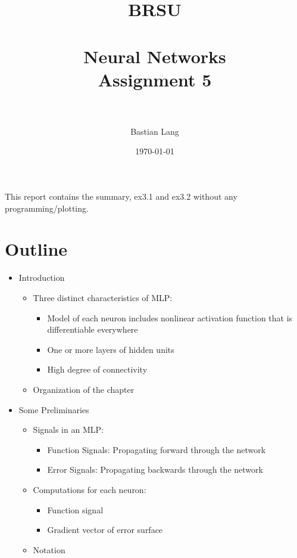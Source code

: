 \documentclass[paper=a4, fontsize=11pt]{scrartcl} %
\title{	
\normalfont \normalsize 
\textsc{BRSU} \\ [25pt] %
\horrule{0.5pt} \\[0.4cm] %
\huge Neural Networks\\Assignment 5 \\ %
\horrule{2pt} \\[0.5cm] %
}
\author{Bastian Lang} %
\date{\normalsize\today} %
\numberwithin{equation}{section} %
\numberwithin{figure}{section} %
\numberwithin{table}{section} %
\begin{document}
\maketitle %

\newpage

This report contains the summary, ex3.1 and ex3.2 without any programming/plotting.

\section{Outline}

\begin{itemize}
	\item Introduction
	\begin{itemize}
		\item Three distinct characteristics of MLP:
		\begin{itemize}
			\item Model of each neuron includes nonlinear activation function that is differentiable everywhere
			\item One or more layers of hidden units
			\item High degree of connectivity
		\end{itemize}
		\item Organization of the chapter
	\end{itemize}
	
	
	\item Some Preliminaries
	\begin{itemize}
		\item Signals in an MLP:
		\begin{itemize}
			\item Function Signals: Propagating forward through the network
			\item Error Signals: Propagating backwards through the network
		\end{itemize}
		\item Computations for each neuron:
		\begin{itemize}
			\item Function signal
			\item Gradient vector of error surface
		\end{itemize}
		\item Notation
	\end{itemize}
	

\end{itemize}
\end{document}
